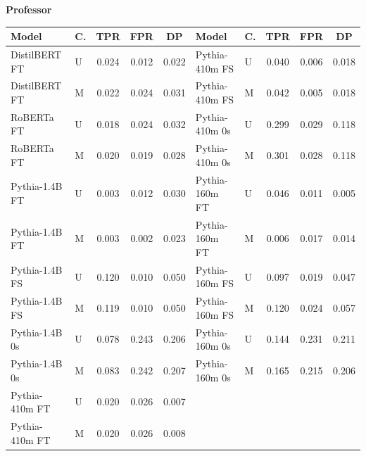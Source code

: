 \documentclass[11pt]{article}
\begin{document}
\vspace{4pt}\noindent\textbf{Professor}
\begin{center}\scriptsize
\begin{tabular}{llccc|llccc}
\toprule
\textbf{Model} & \textbf{C.} & \textbf{TPR} & \textbf{FPR} & \textbf{DP} & \textbf{Model} & \textbf{C.} & \textbf{TPR} & \textbf{FPR} & \textbf{DP} \\
\midrule
DistilBERT FT & U & 0.024 & 0.012 & 0.022 & Pythia-410m FS & U & 0.040 & 0.006 & 0.018 \\
DistilBERT FT & M & 0.022 & 0.024 & 0.031 & Pythia-410m FS & M & 0.042 & 0.005 & 0.018 \\
RoBERTa FT & U & 0.018 & 0.024 & 0.032 & Pythia-410m 0s & U & 0.299 & 0.029 & 0.118 \\
RoBERTa FT & M & 0.020 & 0.019 & 0.028 & Pythia-410m 0s & M & 0.301 & 0.028 & 0.118 \\
Pythia-1.4B FT & U & 0.003 & 0.012 & 0.030 & Pythia-160m FT & U & 0.046 & 0.011 & 0.005 \\
Pythia-1.4B FT & M & 0.003 & 0.002 & 0.023 & Pythia-160m FT & M & 0.006 & 0.017 & 0.014 \\
Pythia-1.4B FS & U & 0.120 & 0.010 & 0.050 & Pythia-160m FS & U & 0.097 & 0.019 & 0.047 \\
Pythia-1.4B FS & M & 0.119 & 0.010 & 0.050 & Pythia-160m FS & M & 0.120 & 0.024 & 0.057 \\
Pythia-1.4B 0s & U & 0.078 & 0.243 & 0.206 & Pythia-160m 0s & U & 0.144 & 0.231 & 0.211 \\
Pythia-1.4B 0s & M & 0.083 & 0.242 & 0.207 & Pythia-160m 0s & M & 0.165 & 0.215 & 0.206 \\
Pythia-410m FT & U & 0.020 & 0.026 & 0.007 & & & & & \\
Pythia-410m FT & M & 0.020 & 0.026 & 0.008 & & & & & \\
\bottomrule
\end{tabular}
\end{center}
\end{document}
